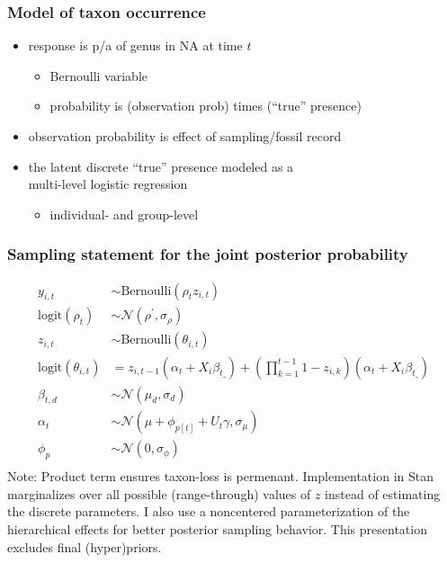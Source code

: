 \documentclass{beamer}
\begin{document}
\begin{frame}
  \frametitle{Model of taxon occurrence}
  \begin{itemize}
    \item response is p/a of genus in NA at time \(t\)
      \begin{itemize}
        \item Bernoulli variable 
        \item probability is (observation prob) times (``true'' presence)
      \end{itemize}
    \item observation probability is effect of sampling/fossil record
    \item the latent discrete ``true'' presence modeled as a \\multi-level logistic regression
      \begin{itemize}
        \item individual- and group-level
      \end{itemize}
  \end{itemize}
\end{frame}

\begin{frame}
  \frametitle{Sampling statement for the joint posterior probability}
  \footnotesize{
    \begin{align*}
      y_{i,t} &\sim \text{Bernoulli}(\rho_{t} z_{i,t}) \\
      \text{logit}(\rho_{t}) &\sim \mathcal{N}(\rho^{'}, \sigma_{\rho}) \\
      z_{i,t} &\sim \text{Bernoulli}(\theta_{i, t}) \\
      \text{logit}(\theta_{i, t}) &= z_{i,t-1} (\alpha_{t} + X_{i} \beta_{t\_}) + (\prod_{k = 1}^{t-1} 1 - z_{i,k}) (\alpha_{t} + X_{i} \beta_{t\_}) \\
      \beta_{t,d} &\sim \mathcal{N}(\mu_{d}, \sigma_{d}) \\
      \alpha_{t} &\sim \mathcal{N}(\mu + \phi_{p[t]} + U_{t} \gamma, \sigma_{\mu}) \\
      \phi_{p} &\sim \mathcal{N}(0, \sigma_{\phi}) \\
    \end{align*}
  }
  \scriptsize{Note: Product term ensures taxon-loss is permenant. Implementation in Stan marginalizes over all possible (range-through) values of \(z\) instead of estimating the discrete parameters. I also use a noncentered parameterization of the hierarchical effects for better posterior sampling behavior. This presentation excludes final (hyper)priors.}
\end{frame}
\end{document}
